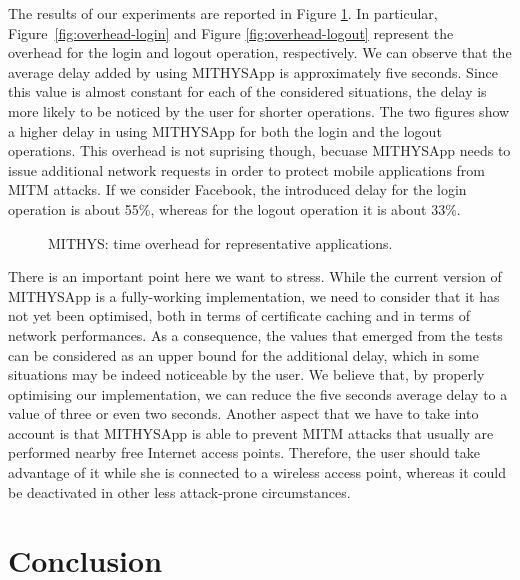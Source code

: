 \documentclass[english]{llncs}
\begin{document}
The results of our experiments are reported in Figure \ref{fig:time-overhead}. In particular, Figure~\ref{fig:overhead-login} and Figure \ref{fig:overhead-logout} represent the overhead for the login and logout operation, respectively. We can observe that the average delay added by using MITHYSApp is approximately five seconds. Since this value is almost constant for each of the considered situations, the delay is more likely to be noticed by the user for shorter operations. The two figures show a higher delay in using MITHYSApp for both the login and the logout operations. This overhead is not suprising though, becuase MITHYSApp needs to issue additional network requests in order to protect mobile applications from MITM attacks. If we consider Facebook, the introduced delay for the login operation is about 55\%, whereas for the logout operation it is about 33\%.

\begin{figure}[t]
\centering
	\caption{MITHYS: time overhead for representative applications.}
	\label{fig:time-overhead}
\end{figure}

There is an important point here we want to stress. While the current version of MITHYSApp is a fully-working implementation, we need to consider that it has not yet been optimised, both in terms of certificate caching and in terms of network performances. As a consequence, the values that emerged from the tests can be considered as an upper bound for the additional delay, which in some situations may be indeed noticeable by the user. We believe that, by properly optimising our implementation, we can reduce the five seconds average delay to a value of three or even two seconds.
Another aspect that we have to take into account is that MITHYSApp is able to prevent MITM attacks that usually are performed nearby free Internet access points. Therefore, the user should take advantage of it while she is connected to a wireless access point, whereas it could be deactivated in other less attack-prone circumstances.



\section{Conclusion}
\label{Conclusion}
\end{document}

